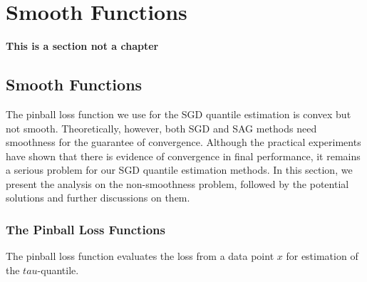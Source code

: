 \chapter{Smooth Functions}
\label{ch: smooth_func}

\textbf{This is a section not a chapter}


\section{Smooth Functions}
The pinball loss function we use for the SGD quantile estimation is convex but not smooth. 
Theoretically, however, both SGD and SAG methods need smoothness for the guarantee of convergence. Although the practical experiments have shown that there is evidence of convergence in final performance, it remains a serious problem for our SGD quantile estimation methods. In this section, we present the analysis on the non-smoothness problem, followed by the potential solutions and further discussions on them.

\subsection{The Pinball Loss Functions}
The pinball loss function evaluates the loss from a data point $x$ for estimation of the $tau$-quantile.